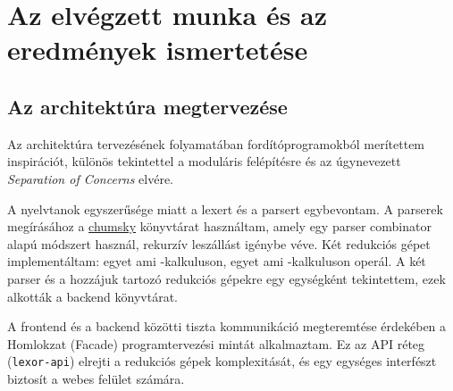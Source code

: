 \documentclass[a4paper,oneside]{article}
\begin{document}
\section{Az elvégzett munka és az eredmények ismertetése}
\label{sec:az-elvegzett-munka}

\subsection{Az architektúra megtervezése}
\label{sec:az-arch-megterv}

Az architektúra tervezésének folyamatában fordítóprogramokból merítettem inspirációt, különös tekintettel a moduláris felépítésre és az úgynevezett \emph{\foreignlanguage{english}{Separation of Concerns}} elvére.

A nyelvtanok egyszerűsége miatt a lexert és a parsert egybevontam. A parserek megírásához a \href{https://codeberg.org/zesterer/chumsky}{chumsky} könyvtárat használtam, amely egy \foreignlanguage{english}{parser combinator} alapú módszert használ, rekurzív leszállást igénybe véve. Két redukciós gépet implementáltam: egyet ami \lam-kalkuluson, egyet ami \ski-kalkuluson operál. A két parser és a hozzájuk tartozó redukciós gépekre egy egységként tekintettem, ezek alkották a backend könyvtárat.

A frontend és a backend közötti tiszta kommunikáció megteremtése érdekében a Homlokzat (\foreignlanguage{english}{Facade}) programtervezési mintát alkalmaztam. Ez az API réteg (\texttt{lexor-api}) elrejti a redukciós gépek komplexitását, és egy egységes interfészt biztosít a webes felület számára.
\end{document}
